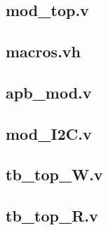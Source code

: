 \appendix
\chapter*{\fuggelek}
\setcounter{chapter}{\appendixnumber}

\section{mod\_top.v}


\section{macros.vh}


\section{apb\_mod.v}
 \label{modapb}

\section{mod\_I2C.v}
 \label{modi2c}

\section{tb\_top\_W.v}
 \label{tbtopW}

\section{tb\_top\_R.v}
 \label{tbtopR}
